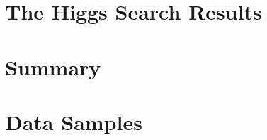 \documentclass{cmspaper}
\begin{document}
\newpage 


\section{The Higgs Search Results}
   \label{sec:dataresults}
   

\section{Summary}
     \label{sec:summary}



\clearpage 
\appendix
\appendixpage

\section{Data Samples}
  \label{sec:appendix_datasets}
  
\clearpage


\end{document}
